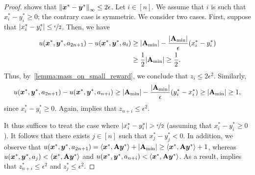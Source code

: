\begin{proof}
     shows that $\left\| {\bm{x}}^* - {\bm{y}}^* \right\|_{\infty} \leq 2 \epsilon$. Let $i \in [n]$. We assume that $i$ is such that $x_i^* - y_i^* \geq 0$; the contrary case is symmetric. We consider two cases. First, suppose that $| x_i^* - y_i^*| \leq \nicefrac{\epsilon}{2}$. Then, we have
    \begin{align*}
        u({\bm{x}}^*, {\bm{y}}^*, a_{2n+1}) - u({\bm{x}}^*, {\bm{y}}^*, a_i) & \geq |\mathbf{A}_{\min}| - \frac{|\mathbf{A}_{\min}|}{\epsilon} ( x^*_i - y^*_i ) \\
        & \geq \frac{1}{2} |\mathbf{A}_{\min}| \geq \frac{1}{2}.
    \end{align*}
    Thus, by~\cref{lemma:mass_on_small_reward}, we conclude that $z_i \leq 2 \epsilon^2$. Similarly,
    \begin{equation*}
        u({\bm{x}}^*, {\bm{y}}^*, a_{2n+1}) - u({\bm{x}}^*, {\bm{y}}^*, a_{n+i}) \geq |\mathbf{A}_{\min}| - \frac{|\mathbf{A}_{\min}|}{\epsilon} (  y^*_i - x_i^* ) \geq |\mathbf{A}_{\min}| \geq 1,
    \end{equation*}
    since $x_i^* - y_i^* \geq 0$. Again,  implies that $z_{n+i} \leq \epsilon^2$.
    
    It thus suffices to treat the case where $| x_i^* - y_i^* | > \nicefrac{\epsilon}{2}$ (assuming that $x_i^* - y_i^* \geq 0$). It follows that there exists $j \in [n]$ such that $x^*_j - y^*_j < 0$. In addition, we observe that $u({\bm{x}}^*, {\bm{y}}^*, a_{2n+1}) = \langle {\bm{x}}^*, \mathbf{A} {\bm{y}}^* \rangle + |\mathbf{A}_{\min}| \geq \langle {\bm{x}}^*, \mathbf{A} {\bm{y}}^* \rangle + 1$, whereas $u({\bm{x}}^*, {\bm{y}}^*, a_j) < \langle {\bm{x}}^*, \mathbf{A} {\bm{y}}^* \rangle$ and $u({\bm{x}}^*, {\bm{y}}^*, a_{n+i}) < \langle {\bm{x}}^*, \mathbf{A} {\bm{y}}^* \rangle$. As a result,  implies that $z^*_{n+i} \leq \epsilon^2$ and $z^*_{j} \leq \epsilon^2$. 
    

\end{proof}
